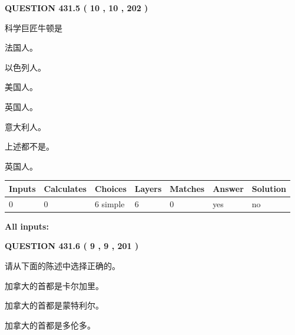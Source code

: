 \documentclass{ctexart}
\begin{document}
{\textbf{\Large{QUESTION
431.5 
 ( 10 , 10 , 202 )
}}}
  
  
科学巨匠牛顿是
 
 
法国人。
 
 
以色列人。
 
 
美国人。
 
 
英国人。
 
 
意大利人。
 
 
 上述都不是。
 
 
\noindent{}
 
 
英国人。
 
 
\noindent{}
 
 
   
   
   
   
\noindent\begin{tabular}{|l|l|l|l|l|l|l|}
 \hline
Inputs & Calculates & Choices & Layers & Matches & Answer & Solution \\ \hline
 0  & 
 0  & 
 6
  simple  
  & 
 6  & 
 0  & 
  yes & 
  no 
  \\ \hline
 \end{tabular}
   
   
   
   
\noindent{}
   
   
   
   
\noindent\vspace{0.1in}\hspace{-0.08in} {\textbf{\Large{All inputs: }}}
   
   
  
\vspace{0.2in}
  
{\textbf{\Large{QUESTION
431.6 
 ( 9 , 9 , 201 )
}}}
  
  
请从下面的陈述中选择正确的。
 
 
加拿大的首都是卡尔加里。
 
 
加拿大的首都是蒙特利尔。
 
 
加拿大的首都是多伦多。
 
\end{document}
